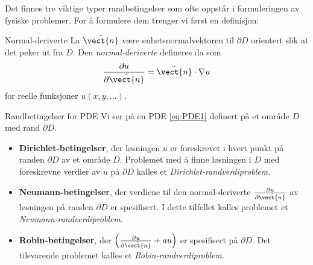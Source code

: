 Det finnes tre viktige typer randbetingelser som ofte oppstår i formuleringen av fysiske problemer. For å formulere dem trenger vi først en definisjon:
\begin{defn}{Normal-deriverte}\label{defn:normalderiv}
La $\hat{\vect{n}}$ være enhetsnormalvektoren til $\partial D$ orientert slik at det peker ut fra $D$. Den  \emph{normal-deriverte} defineres da som
\[ \frac{\partial u}{\partial \hat{\vect{n}}} = \hat{\vect{n} }\cdot \nabla u\]
for reelle funksjoner $u (x,y,\ldots)$.
\end{defn}

\begin{oppsum}{Randbetingelser for PDE}
Vi ser på en PDE \eqref{eq:PDE1} definert på et område $D$ med rand $\partial D$. 
    \begin{itemize}
  \item[1.]\textbf{Dirichlet-betingelser}, der løsningen \( u \) er foreskrevet i hvert punkt på randen \( \partial D \) av et område \( D \). Problemet med å finne løsningen i \( D \) med foreskrevne verdier av \( u \) på \( \partial D \) kalles et \emph{Dirichlet-randverdiproblem}.
  \item[2.]\label{def:neumann}\textbf{Neumann-betingelser}, der verdiene til den normal-deriverte \( \frac{\partial u}{\partial \hat{\vect{n}}} \) av løsningen på randen \( \partial D \) er spesifisert. I dette tilfellet kalles problemet et \emph{Neumann-randverdiproblem}.
  \item[3.]\textbf{Robin-betingelser}, der \( \left( \frac{\partial u}{\partial \hat{\vect{n}}} + a u \right) \) er spesifisert på \( \partial D \). Det tilsvarende problemet kalles et \emph{Robin-randverdiproblem}.
\end{itemize}
\end{oppsum}

